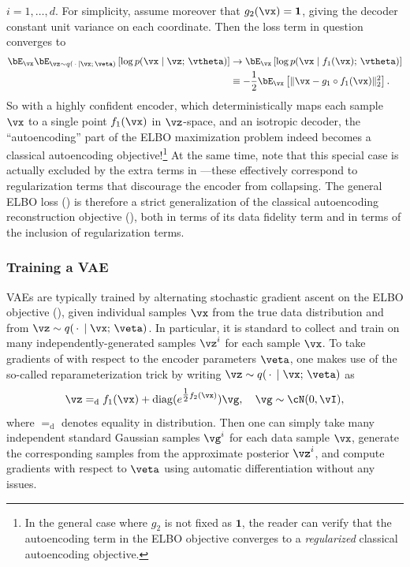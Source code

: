 \documentclass[../../book-main.tex]{subfiles}
\begin{document}
$i = 1, \dots, d$.
For simplicity, assume moreover that $g_2(\vx) = \mathbf{1}$, giving the decoder
constant unit variance on each coordinate.
Then the loss term in question converges to
\begin{align*}
\bE_{\vx}
\bE_{\vz \sim q(\,\cdot\, \mid \vx ;\, \veta)} \left[
  \log p(\vx \mid \vz;\, \vtheta)
\right]
&\to
\bE_{\vx} \left[
  \log p(\vx \mid f_1(\vx);\, \vtheta)
\right]
\\
&\equiv
-\frac{1}{2} \bE_{\vx} \left[
  \|\vx - g_1\circ f_1(\vx)\|_2^2
\right].
\end{align*}
So with a highly confident encoder, which deterministically maps each sample
$\vx$ to a single point $f_1(\vx)$ in $\vz$-space, and an isotropic decoder,
the ``autoencoding'' part of the ELBO maximization problem indeed becomes
a classical autoencoding objective!\footnote{In the general case where $g_2$ is
not fixed as $\mathbf{1}$, the reader can verify that the autoencoding term in
the ELBO objective converges to a \textit{regularized} classical autoencoding
objective.}
At the same time, note that this special case is actually excluded by the
extra terms in ---these effectively correspond to
regularization terms that discourage the encoder from collapsing.
The general ELBO loss () is
therefore a strict generalization of the classical autoencoding reconstruction
objective (), both in terms of its data fidelity term
and in terms of the inclusion of regularization terms.

\subsubsection{Training a VAE}
VAEs are typically trained by alternating stochastic gradient ascent on the ELBO
objective (), given individual samples
$\vx$ from the
true data distribution and from $\vz \sim q(\,\cdot\,\mid \vx;\, \veta)$. In
particular, it is standard to collect and train on many independently-generated
samples $\vz^{i}$ for each sample $\vx$. To take gradients of
 with respect to the encoder parameters $\veta$,
one makes use of the so-called reparameterization trick by writing $\vz \sim
q(\,\cdot\,\mid \vx;\, \veta)$ as
\begin{equation*}
\vz =_{\mathrm{d}} f_1(\vx) + \diag(e^{\tfrac{1}{2}f_2(\vx)}) \vg,
\quad \vg \sim
\cN(0, \vI),
\end{equation*}
where $=_{\mathrm{d}}$ denotes equality in distribution. Then one can simply
take many independent standard Gaussian samples $\vg^{i}$ for each data sample
$\vx$, generate the corresponding samples from the approximate posterior
$\vz^i$, and compute gradients with respect to $\veta$ using automatic
differentiation without any issues.
\end{document}
